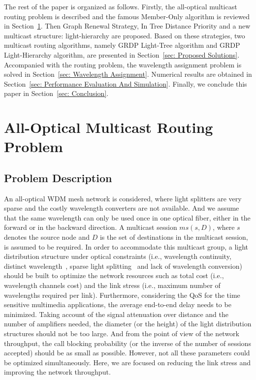 \documentclass[conference]{IEEEtran}
\begin{document}
The rest of the paper is organized as follows. Firstly, the all-optical multicast routing problem is described and the famous Member-Only algorithm is reviewed in Section~\ref{sec: All-Optical Multicast Routing Problem}. Then Graph Renewal Strategy, In Tree Distance Priority and a new multicast structure: light-hierarchy are proposed. Based on these strategies, two multicast routing algorithms, namely GRDP Light-Tree algorithm and GRDP Light-Hierarchy algorithm, are presented in Section~\ref{sec: Proposed Solutions}. Accompanied with the routing problem, the wavelength assignment problem is solved in Section~\ref{sec: Wavelength Assignment}. Numerical results are obtained in Section~\ref{sec: Performance Evaluation And Simulation}. Finally, we conclude this paper in Section~\ref{sec: Conclusion}.

\section{All-Optical Multicast Routing Problem}
\label{sec: All-Optical Multicast Routing Problem}
\subsection{Problem Description}
\label{subsec: Problem Description}
An all-optical WDM mesh network is considered, where light splitters are very sparse and the costly wavelength converters are not available. And we assume that the same wavelength can only be used once in one optical fiber, either in the forward or in the backward direction. A multicast session $ms(s, D)$, where $s$ denotes the source node and $D$ is the set of destinations in the multicast session, is assumed to be required. In order to accommodate this multicast group, a light distribution structure under optical constraints (i.e., wavelength continuity, distinct wavelength~\cite{bMukherjee2000}, sparse light splitting~\cite{rMalli1998} and lack of wavelength conversion) should be built to optimize the network resources such as total cost (i.e., wavelength channels cost) and the link stress (i.e., maximum number of wavelengths required per link). Furthermore, considering the QoS for the time sensitive multimedia applications, the average end-to-end delay needs to be minimized. Taking account of the signal attenuation over distance and the number of amplifiers needed, the diameter (or the height) of the light distribution structures should not be too large. And from the point of view of the network throughput, the call blocking probability (or the inverse of the number of sessions accepted) should be as small as possible. However, not all these parameters could be optimized simultaneously. Here, we are focused on reducing the link stress and improving the network throughput.
\end{document}
